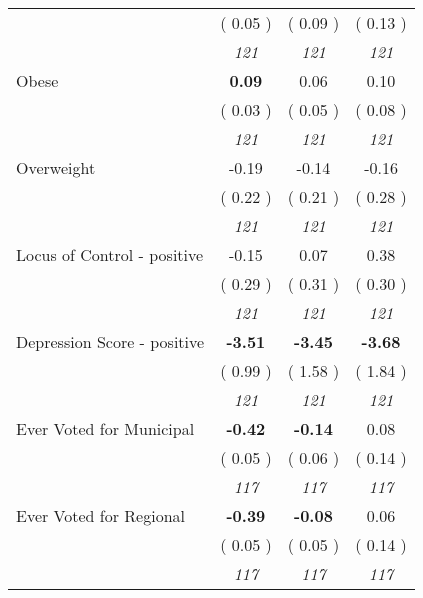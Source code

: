 \begin{tabular}{l c c c}
& (     0.05 ) & (     0.09 ) & (     0.13 ) \\
& \textit{ 121 } & \textit{ 121 } & \textit{ 121 } \\
Obese & \textbf{      0.09 } &      0.06 &      0.10 \\
& (     0.03 ) & (     0.05 ) & (     0.08 ) \\
& \textit{ 121 } & \textit{ 121 } & \textit{ 121 } \\
Overweight &     -0.19 &     -0.14 &     -0.16 \\
& (     0.22 ) & (     0.21 ) & (     0.28 ) \\
& \textit{ 121 } & \textit{ 121 } & \textit{ 121 } \\
Locus of Control - positive &     -0.15 &      0.07 &      0.38 \\
& (     0.29 ) & (     0.31 ) & (     0.30 ) \\
& \textit{ 121 } & \textit{ 121 } & \textit{ 121 } \\
Depression Score - positive & \textbf{     -3.51 } & \textbf{     -3.45 } & \textbf{     -3.68 } \\
& (     0.99 ) & (     1.58 ) & (     1.84 ) \\
& \textit{ 121 } & \textit{ 121 } & \textit{ 121 } \\
Ever Voted for Municipal & \textbf{     -0.42 } & \textbf{     -0.14 } &      0.08 \\
& (     0.05 ) & (     0.06 ) & (     0.14 ) \\
& \textit{ 117 } & \textit{ 117 } & \textit{ 117 } \\
Ever Voted for Regional & \textbf{     -0.39 } & \textbf{     -0.08 } &      0.06 \\
& (     0.05 ) & (     0.05 ) & (     0.14 ) \\
& \textit{ 117 } & \textit{ 117 } & \textit{ 117 } \\
\bottomrule
\end{tabular}
